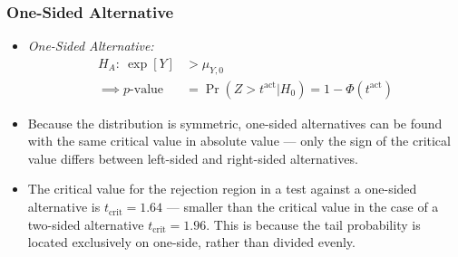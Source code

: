 \begin{frame}
\frametitle{One-Sided Alternative}
\begin{itemize}
\item \emph{One-Sided Alternative:}
\begin{align*}
H_A{:}~ \exp[Y] & > \mu_{Y,0} \\
\implies 
 p\text{-value} & = \Pr(Z > t^{\text{act}} | H_0) = 1 - \Phi(t^{\text{act}})
\end{align*}
\item Because the distribution is symmetric, one-sided alternatives can be found with the same critical value in absolute value --- only the sign of the critical value differs between left-sided and right-sided alternatives. 
\item The critical value for the rejection region in a test against a one-sided alternative is $t_{\text{crit}}=1.64$ --- smaller than the critical value in the case of a two-sided alternative $t_{\text{crit}}=1.96$. This is because the tail probability is located exclusively on one-side, rather than divided evenly. 
\end{itemize}
\end{frame}

